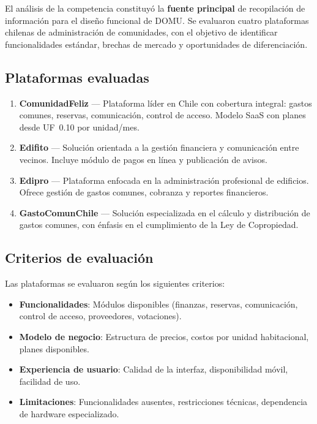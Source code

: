 El análisis de la competencia constituyó la \textbf{fuente principal} de recopilación de información para el diseño funcional de DOMU. Se evaluaron cuatro plataformas chilenas de administración de comunidades, con el objetivo de identificar funcionalidades estándar, brechas de mercado y oportunidades de diferenciación.

\subsection{Plataformas evaluadas}

\begin{enumerate}
    \item \textbf{ComunidadFeliz} --- Plataforma líder en Chile con cobertura integral: gastos comunes, reservas, comunicación, control de acceso. Modelo SaaS con planes desde UF~0.10 por unidad/mes.

    \item \textbf{Edifito} --- Solución orientada a la gestión financiera y comunicación entre vecinos. Incluye módulo de pagos en línea y publicación de avisos.

    \item \textbf{Edipro} --- Plataforma enfocada en la administración profesional de edificios. Ofrece gestión de gastos comunes, cobranza y reportes financieros.

    \item \textbf{GastoComunChile} --- Solución especializada en el cálculo y distribución de gastos comunes, con énfasis en el cumplimiento de la Ley de Copropiedad.
\end{enumerate}

\subsection{Criterios de evaluación}

Las plataformas se evaluaron según los siguientes criterios:
\begin{itemize}
    \item \textbf{Funcionalidades}: Módulos disponibles (finanzas, reservas, comunicación, control de acceso, proveedores, votaciones).
    \item \textbf{Modelo de negocio}: Estructura de precios, costos por unidad habitacional, planes disponibles.
    \item \textbf{Experiencia de usuario}: Calidad de la interfaz, disponibilidad móvil, facilidad de uso.
    \item \textbf{Limitaciones}: Funcionalidades ausentes, restricciones técnicas, dependencia de hardware especializado.
\end{itemize}


